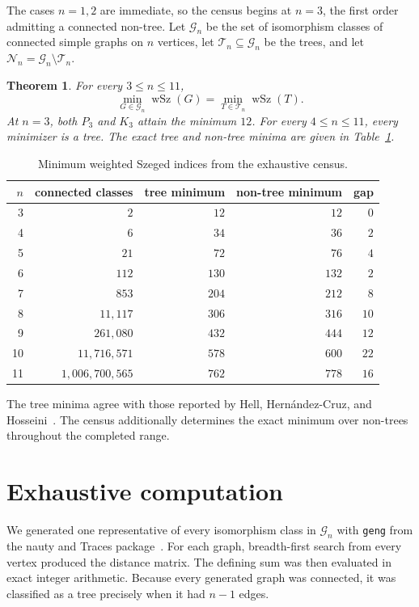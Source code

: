 \documentclass[11pt]{amsart}
\newtheorem{theorem}{Theorem}
\newcommand{\wSz}{\operatorname{wSz}}
\newcommand{\G}{\mathcal{G}}
\newcommand{\T}{\mathcal{T}}
\newcommand{\N}{\mathcal{N}}
\begin{document}
The cases $n=1,2$ are immediate, so the census begins at $n=3$, the
first order admitting a connected non-tree. Let $\G_n$ be the set of
isomorphism classes of connected simple graphs on $n$ vertices, let
$\T_n\subseteq\G_n$ be the trees, and let
$\N_n=\G_n\setminus\T_n$.

\begin{theorem}\label{thm:main}
For every $3\le n\le 11$,
\[
  \min_{G\in\G_n}\wSz(G)
  =
  \min_{T\in\T_n}\wSz(T).
\]
At $n=3$, both $P_3$ and $K_3$ attain the minimum $12$. For every
$4\le n\le 11$, every minimizer is a tree. The exact tree and
non-tree minima are given in Table~\ref{tab:minima}.
\end{theorem}

\begin{table}[ht]
\centering
\small
\caption{Minimum weighted Szeged indices from the exhaustive census.}
\label{tab:minima}
\begin{tabular}{@{}rrrrr@{}}
\toprule
$n$
  & connected classes
  & tree minimum
  & non-tree minimum
  & gap \\
\midrule
3  & $2$                   & $12$  & $12$  & $0$  \\
4  & $6$                   & $34$  & $36$  & $2$  \\
5  & $21$                  & $72$  & $76$  & $4$  \\
6  & $112$                 & $130$ & $132$ & $2$  \\
7  & $853$                 & $204$ & $212$ & $8$  \\
8  & $11{,}117$            & $306$ & $316$ & $10$ \\
9  & $261{,}080$           & $432$ & $444$ & $12$ \\
10 & $11{,}716{,}571$      & $578$ & $600$ & $22$ \\
11 & $1{,}006{,}700{,}565$ & $762$ & $778$ & $16$ \\
\bottomrule
\end{tabular}
\end{table}

The tree minima agree with those reported by Hell,
Hern\'andez-Cruz, and Hosseini~\cite{HellEtAl2024}. The census
additionally determines the exact minimum over non-trees throughout
the completed range.

\section{Exhaustive computation}

We generated one representative of every isomorphism class in
$\G_n$ with \texttt{geng} from the nauty and Traces
package~\cite{McKayPiperno2014}. For each graph, breadth-first search
from every vertex produced the distance matrix. The defining sum was
then evaluated in exact integer arithmetic. Because every generated
graph was connected, it was classified as a tree precisely when it
had $n-1$ edges.
\end{document}
